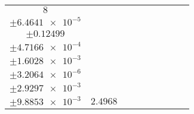 \documentclass[8pt]{article}
\begin{document}
\begin{longtable}[l]{c c c c c c c c c}
$\num{8}$ & \begin{tabular}[c]{@{}c@{}}$\num{3.0108e-2}$ \\ $\pm\num{6.4641e-5}$\end{tabular} & \begin{tabular}[c]{@{}c@{}}$\num{0.30988}$ \\ $\pm\num{0.12499}$\end{tabular} & \begin{tabular}[c]{@{}c@{}}$\num{9.3676}$ \\ $\pm\num{4.7166e-4}$\end{tabular} & \begin{tabular}[c]{@{}c@{}}$\num{740.04}$ \\ $\pm\num{1.6028e-3}$\end{tabular} & \begin{tabular}[c]{@{}c@{}}$\num{1.4805}$ \\ $\pm\num{3.2064e-6}$\end{tabular} & \begin{tabular}[c]{@{}c@{}}$\num{1.1639}$ \\ $\pm\num{2.9297e-3}$\end{tabular} & \begin{tabular}[c]{@{}c@{}}$\num{4.1923}$ \\ $\pm\num{9.8853e-3}$\end{tabular} & $\num{2.4968}$\\
\bottomrule
\end{longtable}
\end{document}

